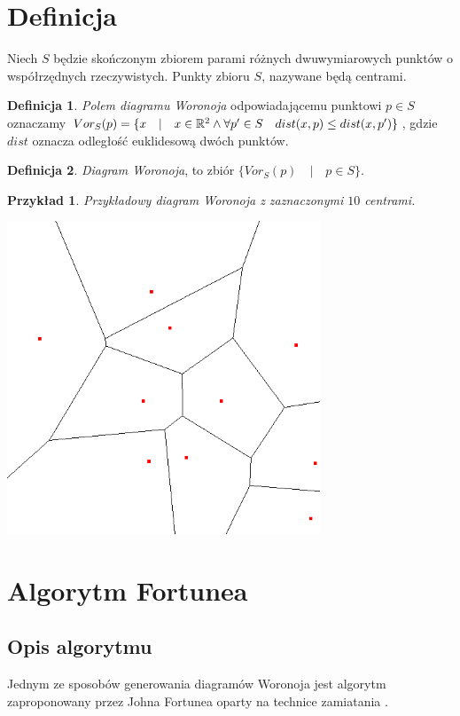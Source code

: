 \documentclass[declaration,shortabstract, inz]{iithesis}
\theoremstyle{definition} \newtheorem{definition}{Definicja}[]
\theoremstyle{plain} \newtheorem{remark}[definition]{Obserwacja}
\theoremstyle{plain} \newtheorem{theorem}[definition]{Twierdzenie}
\theoremstyle{plain} \newtheorem{example}{Przykład}[definition]
\theoremstyle{plain} \newtheorem{lemma}[definition]{Lemat}
\begin{document}
\section{Definicja}
Niech $S$ będzie skończonym zbiorem parami różnych dwuwymiarowych punktów o współrzędnych rzeczywistych. Punkty zbioru $S$, nazywane będą centrami.

\begin{definition}
	   \textit{Polem diagramu Woronoja} odpowiadającemu punktowi $p \in S$ oznaczamy $Vor_S(p) = \{ x \quad | \quad x 		\in \mathbb{R}^2 \land \forall p' \in S \quad \space dist(x, p) \leq dist(x, p')\}$, gdzie $dist$ oznacza odległość euklidesową dwóch punktów.
\end{definition}

\begin{definition}
	   \textit{Diagram Woronoja}, to zbiór $\{ Vor_S(p) \quad  | \quad p \in S\}$.
\end{definition}

\begin{example}
Przykładowy diagram Woronoja z zaznaczonymi $10$ centrami.
	\begin{center}
		\includegraphics[width=0.7\textwidth]{ExampleDiagram}
	\end{center}
\end{example}

\section{Algorytm Fortunea}
\label{sec:fortune}
\subsection{Opis algorytmu}
Jednym ze sposobów  generowania diagramów Woronoja jest algorytm zaproponowany przez Johna Fortunea oparty na technice zamiatania \cite{miotla}. 
\end{document}
